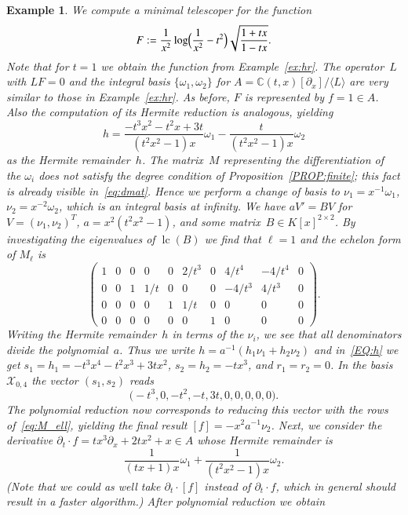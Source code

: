 \documentclass[final,1p,times,authoryear]{elsarticle}
\newtheorem{example}[theorem]{Example}
\def\<#1>{\langle#1\rangle}
\newcommand{\bC}{ {\mathbb C}}
\newcommand{\cX}{ {\mathcal X}}
\def\lc{\operatorname{lc}}
\begin{document}
\begin{example}
We compute a minimal telescoper for the function
\[
  F := \frac{1}{x^2} \log\Bigl(\frac{1}{x^2}-t^2\Bigr)\sqrt{\frac{1+tx}{1-tx}}.
\]
Note that for $t=1$ we
obtain the function from Example~\ref{ex:hr}. The operator~$L$ with $LF=0$
and the integral basis $\{\omega_1,\omega_2\}$ for
$A=\bC(t,x)[\partial_x]/\<L>$ are very similar to those in Example~\ref{ex:hr}.
As before, $F$ is represented by $f=1\in A$.
Also the computation of its Hermite reduction is analogous, yielding
\[
  h = \frac{-t^3x^2-t^2x+3t}{(t^2x^2-1)x} \omega_1 - \frac{t}{(t^2x^2-1)x} \omega_2
\]
as the Hermite remainder~$h$. The matrix~$M$ representing the differentiation
of the $\omega_i$ does not satisfy the degree condition of
Proposition~\ref{PROP:finite}; this fact is already visible
in~\eqref{eq:dmat}. Hence we perform a change of basis to
$\nu_1=x^{-1}\omega_1$, $\nu_2=x^{-2}\omega_2$, which is an integral basis at
infinity. We have $aV'=BV$ for $V=(\nu_1,\nu_2)^T$, $a=x^2(t^2x^2-1)$, and
some matrix~$B\in K[x]^{2\times2}$.  By investigating the eigenvalues of
$\lc(B)$ we find that $\ell=1$ and the echelon form of $M_\ell$ is
\begin{equation}\label{eq:M_ell}
  \begin{pmatrix}
  1 & 0 & 0 & 0 & 0 & 2/t^3 & 0 & 4/t^4 & -4/t^4 & 0 \\
  0 & 0 & 1 & 1/t & 0 & 0 & 0 & -4/t^3 & 4/t^3 & 0 \\
  0 & 0 & 0 & 0 & 1 & 1/t & 0 & 0 & 0 & 0 \\
  0 & 0 & 0 & 0 & 0 & 0 & 1 & 0 & 0 & 0
  \end{pmatrix}.
\end{equation}
Writing the Hermite remainder~$h$ in terms of the $\nu_i$, we see that all
denominators divide the polynomial~$a$. Thus we write
$h=a^{-1}(h_1\nu_1+h_2\nu_2)$ and in~\eqref{EQ:h} we get
$s_1=h_1=-t^3x^4-t^2x^3+3tx^2$, $s_2=h_2=-tx^3$, and $r_1=r_2=0$.
In the basis $\cX_{0,4}$ the vector $(s_1,s_2)$ reads
\[
  \bigl(-t^3, 0, -t^2, -t, 3 t, 0, 0, 0, 0, 0\bigr).
\]
The polynomial reduction now corresponds to reducing this vector with the rows
of~\eqref{eq:M_ell}, yielding the final result $[f]=-x^2a^{-1}\nu_2$.  Next, we
consider the derivative $\partial_t\cdot f=tx^3\partial_x+2tx^2+x\in A$ whose
Hermite remainder is
\[
  \frac{1}{(tx+1)x} \omega_1 + \frac{1}{(t^2x^2-1)x} \omega_2.
\]
(Note that we could as well take $\partial_t\cdot [f]$ instead of $\partial_t\cdot f$, which
in general should result in a faster algorithm.)
After polynomial reduction we obtain

\end{example}
\end{document}
